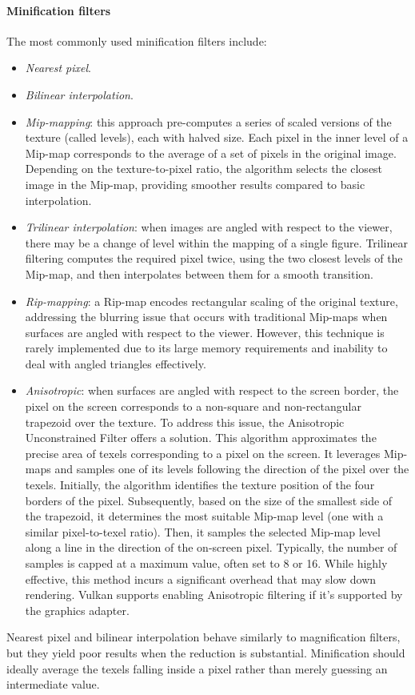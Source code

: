 \paragraph*{Minification filters}
The most commonly used minification filters include:
\begin{itemize}
    \item \textit{Nearest pixel}. 
    \item \textit{Bilinear interpolation}.
    \item \textit{Mip-mapping}: this approach pre-computes a series of scaled versions of the texture (called levels), each with halved size. 
        Each pixel in the inner level of a Mip-map corresponds to the average of a set of pixels in the original image. 
        Depending on the texture-to-pixel ratio, the algorithm selects the closest image in the Mip-map, providing smoother results compared to basic interpolation.
    \item \textit{Trilinear interpolation}: when images are angled with respect to the viewer, there may be a change of level within the mapping of a single figure. 
        Trilinear filtering computes the required pixel twice, using the two closest levels of the Mip-map, and then interpolates between them for a smooth transition.
    \item \textit{Rip-mapping}: a Rip-map encodes rectangular scaling of the original texture, addressing the blurring issue that occurs with traditional Mip-maps when surfaces are angled with respect to the viewer. 
        However, this technique is rarely implemented due to its large memory requirements and inability to deal with angled triangles effectively.
    \item \textit{Anisotropic}: when surfaces are angled with respect to the screen border, the pixel on the screen corresponds to a non-square and non-rectangular trapezoid over the texture. 
        To address this issue, the Anisotropic Unconstrained Filter offers a solution.
        This algorithm approximates the precise area of texels corresponding to a pixel on the screen. 
        It leverages Mip-maps and samples one of its levels following the direction of the pixel over the texels. 
        Initially, the algorithm identifies the texture position of the four borders of the pixel. 
        Subsequently, based on the size of the smallest side of the trapezoid, it determines the most suitable Mip-map level (one with a similar pixel-to-texel ratio). Then, it samples the selected Mip-map level along a line in the direction of the on-screen pixel. 
        Typically, the number of samples is capped at a maximum value, often set to 8 or 16.
        While highly effective, this method incurs a significant overhead that may slow down rendering.
        Vulkan supports enabling Anisotropic filtering if it's supported by the graphics adapter.
\end{itemize}
Nearest pixel and bilinear interpolation behave similarly to magnification filters, but they yield poor results when the reduction is substantial. 
Minification should ideally average the texels falling inside a pixel rather than merely guessing an intermediate value.